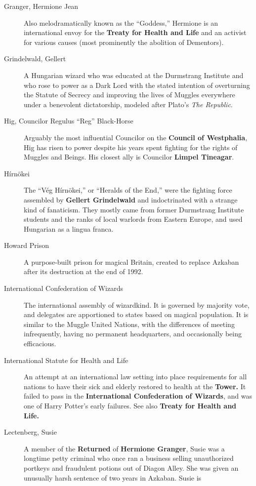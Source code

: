 \begin{description}
\item[Granger, Hermione Jean]
Also melodramatically known as the ``Goddess,'' Hermione is an
international envoy for the \textbf{Treaty for Health and Life} and an
activist for various causes (most prominently the abolition of
Dementors).
\item[Grindelwald, Gellert]
A Hungarian wizard who was educated at the Durmstrang Institute and who
rose to power as a Dark Lord with the stated intention of overturning
the Statute of Secrecy and improving the lives of Muggles everywhere
under a benevolent dictatorship, modeled after Plato's \emph{The
Republic}.
\item[Hig, Councilor Regulus ``Reg'' Black-Horse]
Arguably the most influential Councilor on the \textbf{Council of
Westphalia}, Hig has risen to power despite his years spent fighting for
the rights of Muggles and Beings. His closest ally is Councilor
\textbf{Limpel Tineagar}.
\item[Hírnökei]
The ``Vég Hírnökei,'' or ``Heralds of the End,'' were the fighting force
assembled by \textbf{Gellert Grindelwald} and indoctrinated with a
strange kind of fanaticism. They mostly came from former Durmstrang
Institute students and the ranks of local warlords from Eastern Europe,
and used Hungarian as a lingua franca.
\item[Howard Prison]
A purpose-built prison for magical Britain, created to replace Azkaban
after its destruction at the end of 1992.
\item[International Confederation of Wizards]
The international assembly of wizardkind. It is governed by majority
vote, and delegates are apportioned to states based on magical
population. It is similar to the Muggle United Nations, with the
differences of meeting infrequently, having no permanent headquarters,
and occasionally being efficacious.
\item[International Statute for Health and Life]
An attempt at an international law setting into place requirements for
all nations to have their sick and elderly restored to health at the
\textbf{Tower. }It failed to pass in the \textbf{International
Confederation of Wizards}, and was one of Harry Potter's early failures.
See also \textbf{Treaty for Health and Life.}
\item[Lectenberg, Susie]
A member of the \textbf{Returned} of \textbf{Hermione Granger}, Susie
was a longtime petty criminal who once ran a business selling
unauthorized portkeys and fraudulent potions out of Diagon Alley. She
was given an unusually harsh sentence of two years in Azkaban. Susie is

\end{description}

